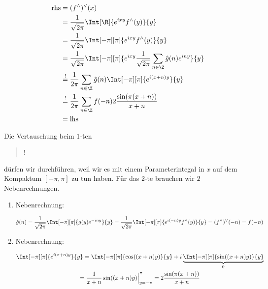 \begin{solution}
\begin{enumerate}[label = \arabic*.]
    \begin{align*}
        \mathrm{rhs}
        & =
        (f^\wedge)^\vee(x) \\
        & =
        \frac{1}{\sqrt{2 \pi}}
        \Int[\R]
        {
            e^{i x y}
            f^\wedge(y)
        }{y} \\
        & =
        \frac{1}{\sqrt{2 \pi}}
        \Int[-\pi][\pi]
        {
            e^{i x y}
            f^\wedge(y)
        }{y} \\
        & =
        \frac{1}{\sqrt{2 \pi}}
        \Int[-\pi][\pi]
        {
            e^{i x y}
            \frac{1}{\sqrt{2 \pi}}
            \sum_{n \in \Z}
            \hat g(n)
            e^{i n y}
        }{y} \\
        & \stackrel{!}{=}
        \frac{1}{2 \pi}
        \sum_{n \in \Z}
        \hat g(n)
        \Int[-\pi][\pi]
        {
            e^{i (x + n) y}
        }{y} \\
        & \stackrel{!}{=}
        \frac{1}{2 \pi}
        \sum_{n \in \Z}
        f(-n)
        2 \frac{\sin(\pi (x + n))}{x + n} \\
        & =
        \mathrm{lhs}
    \end{align*}

    Die Vertauschung beim $1$-ten \blockquote{!} dürfen wir durchführen, weil wir es mit einem Parameterintegal in $x$ auf dem Kompaktum $[-\pi, \pi]$ zu tun haben.
    Für das $2$-te brauchen wir $2$ Nebenrechnungen.

    \begin{enumerate}[label = \arabic*.]

        \item Nebenrechnung:
        
        \begin{align*}
            \hat g(n)
            =
            \frac{1}{\sqrt{2 \pi}}
            \Int[-\pi][\pi]
            {
                g(y)
                e^{-i n y}
            }{y}
            =
            \frac{1}{\sqrt{2 \pi}}
            \Int[-\pi][\pi]
            {
                e^{i (-n) y}
                f^\wedge(y)
            }{y}
            =
            (f^\wedge)^\vee(-n)
            =
            f(-n)
        \end{align*}

        \item Nebenrechnung:

        \begin{multline*}
            \Int[-\pi][\pi]
            {
                e^{i (x + n) y}
            }{y}
            =
            \Int[-\pi][\pi]
            {
                \cos((x + n) y)
            }{y}
            +
            i
            \underbrace
            {
                \Int[-\pi][\pi]
                {
                    \sin((x + n) y)
                }{y}
            }_0 \\
            =
            \frac{1}{x + n}
            \sin((x + n) y) \Big |_{y = -\pi}^\pi
            =
            2 \frac{\sin(\pi (x + n))}{x + n}
        \end{multline*}
    

\end{enumerate}
\end{enumerate}
\end{solution}
